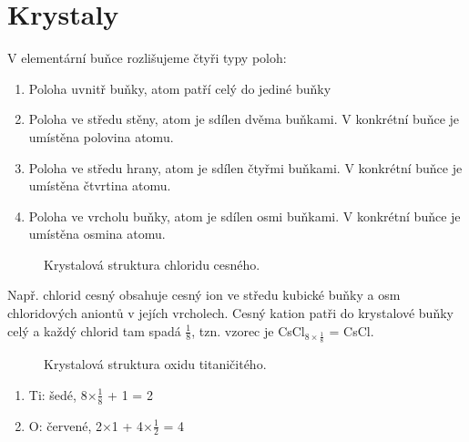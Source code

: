 \section{Krystaly}

V elementární buňce rozlišujeme čtyři typy poloh:
\begin{enumerate}
	\item Poloha uvnitř buňky, atom patří celý do jediné buňky
	\item Poloha ve středu stěny, atom je sdílen dvěma buňkami. V konkrétní buňce je umístěna polovina atomu.
	\item Poloha ve středu hrany, atom je sdílen čtyřmi buňkami. V konkrétní buňce je umístěna čtvrtina atomu.
	\item Poloha ve vrcholu buňky, atom je sdílen osmi buňkami. V konkrétní buňce je umístěna osmina atomu.
\end{enumerate}

\begin{figure}[h]
	\caption[Krystalová struktura chloridu cesného.]{Krystalová struktura chloridu cesného.\footnotemark}
\end{figure}

Např. chlorid cesný obsahuje cesný ion ve středu kubické buňky a osm chloridových aniontů v jejích vrcholech. Cesný kation patři do krystalové buňky celý a každý chlorid tam spadá $\frac{1}{8}$, tzn. vzorec je CsCl$_{8\times\frac{1}{8}}$ = CsCl.

\begin{figure}[h]
	\caption[Krystalová struktura chloridu cesného.]{Krystalová struktura oxidu titaničitého.\footnotemark}
\end{figure}

\begin{enumerate}
	\item Ti: šedé, 8$\times\frac{1}{8}$ + 1 = 2
	\item O: červené, 2$\times$1 + 4$\times\frac{1}{2}$ = 4
\end{enumerate}

\clearpage